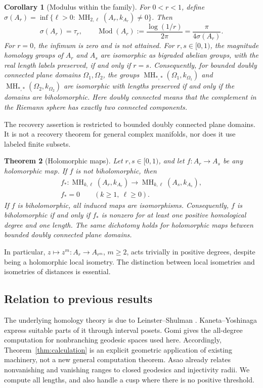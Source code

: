 \documentclass[12pt]{amsart}
\newtheorem{thm}{Theorem}[section]
\newtheorem{cor}[thm]{Corollary}
\theoremstyle{definition}
\theoremstyle{remark}
\numberwithin{equation}{section}
\DeclareMathOperator{\MH}{MH}
\begin{document}
\begin{cor}[Modulus within the family]\label{cor:modulus}
For $0<r<1$, define $\sigma(A_r)=\inf\{\ell>0:\MH_{2,\ell}(A_r,k_{A_r})\ne0\}$. Then
\begin{equation}\label{eq:modulus}
 \sigma(A_r)=\tau_r,\qquad
 \operatorname{Mod}(A_r):=\frac{\log(1/r)}{2\pi}=\frac{\pi}{4\sigma(A_r)}.
\end{equation}
For $r=0$, the infimum is zero and is not attained. For $r,s\in[0,1)$, the magnitude homology groups of $A_r$ and $A_s$ are isomorphic as bigraded abelian groups, with the real length labels preserved, if and only if $r=s$. Consequently, for bounded doubly connected plane domains $\Omega_1,\Omega_2$, the groups $\MH_{*,*}(\Omega_1,k_{\Omega_1})$ and $\MH_{*,*}(\Omega_2,k_{\Omega_2})$ are isomorphic with lengths preserved if and only if the domains are biholomorphic. Here doubly connected means that the complement in the Riemann sphere has exactly two connected components.
\end{cor}
The recovery assertion is restricted to bounded doubly connected plane domains. It is not a recovery theorem for general complex manifolds, nor does it use labeled finite subsets.

\begin{thm}[Holomorphic maps]\label{thm:maps}
Let $r,s\in[0,1)$, and let $f:A_r\to A_s$ be any holomorphic map. If $f$ is not biholomorphic, then
\begin{equation}\label{eq:map-zero}
\begin{gathered}
 f_*:\MH_{k,\ell}(A_r,k_{A_r})\longrightarrow\MH_{k,\ell}(A_s,k_{A_s}),\\
 f_*=0\qquad(k\ge1,\ \ell\ge0).
\end{gathered}
\end{equation}
If $f$ is biholomorphic, all induced maps are isomorphisms. Consequently, $f$ is biholomorphic if and only if $f_*$ is nonzero for at least one positive homological degree and one length. The same dichotomy holds for holomorphic maps between bounded doubly connected plane domains.
\end{thm}
In particular, $z\mapsto z^m:A_r\to A_{r^m}$, $m\ge2$, acts trivially in positive degrees, despite being a holomorphic local isometry. The distinction between local isometries and isometries of distances is essential.

\subsection*{Relation to previous results}
The underlying homology theory is due to Leinster--Shulman \cite[Definitions 3.3--3.4]{LS}. Kaneta--Yoshinaga \cite{KY} express suitable parts of it through interval posets. Gomi \cite[Theorem 5.22]{Gomi} gives the all-degree computation for nonbranching geodesic spaces used here. Accordingly, Theorem~\ref{thm:calculation} is an explicit geometric application of existing machinery, not a new general computation theorem. Asao \cite[Theorem 5.3, Corollary 6.5]{Asao} already relates nonvanishing and vanishing ranges to closed geodesics and injectivity radii. We compute all lengths, and also handle a cusp where there is no positive threshold.
\end{document}
